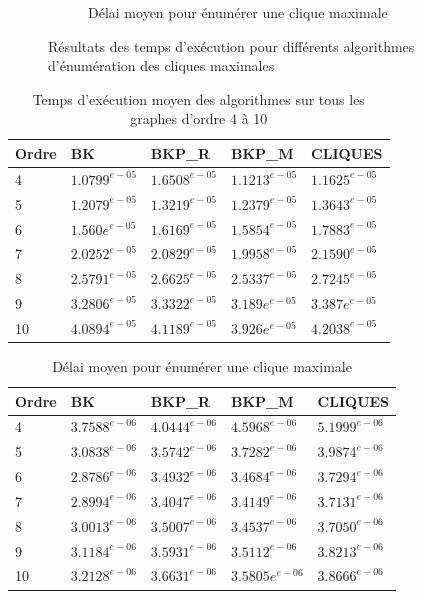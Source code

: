 \documentclass[12pt,a4paper]{article}
\begin{document}
\begin{figure}[h!]
\begin{subfigure}[b]{0.49\textwidth}
        \caption{Délai moyen pour énumérer une clique maximale}
        \label{subfig:delay_plot}
    \end{subfigure}
    \caption{Résultats des temps d'exécution pour différents algorithmes d'énumération des cliques maximales}
    \label{fig:res1}
\end{figure}

\begin{table}[ht]
  \centering
  \begin{tabular}{|l||l|l|l|l|}
    \hline
    Ordre & BK & BKP\_R & BKP\_M & CLIQUES \\
    \hline
    \hline
    4  & $1.0799^{e-05}$ & $1.6508^{e-05}$ & $1.1213^{e-05}$ & $1.1625^{e-05}$ \\
    5  & $1.2079^{e-05}$ & $1.3219^{e-05}$ & $1.2379^{e-05}$ & $1.3643^{e-05}$ \\
    6  & $1.560e^{e-05}$  & $1.6169^{e-05}$ & $1.5854^{e-05}$  & $1.7883^{e-05}$ \\
    7  & $2.0252^{e-05}$ & $2.0829^{e-05}$ & $1.9958^{e-05}$ & $2.1590^{e-05}$   \\
    8  & $2.5791^{e-05}$ & $2.6625^{e-05}$ & $2.5337^{e-05}$   & $2.7245^{e-05}$ \\
    9  & $3.2806^{e-05}$ & $3.3322^{e-05}$  & $3.189e^{e-05}$  & $3.387e^{e-05}$  \\
    10 & $4.0894^{e-05}$ & $4.1189^{e-05}$ & $3.926e^{e-05}$ & $4.2038^{e-05}$  \\
    \hline
  \end{tabular}
  \caption{Temps d'exécution moyen des algorithmes sur tous les graphes d'ordre 4 à 10}
  \label{table:1}
\end{table}
\begin{table}[ht]
  \centering
  \begin{tabular}{|l||l|l|l|l|}
    \hline
    Ordre & BK & BKP\_R & BKP\_M & CLIQUES \\
    \hline
    \hline
    4  & $3.7588^{e-06}$ & $4.0444^{e-06}$ & $4.5968^{e-06}$ & $5.1999^{e-06}$ \\
    5  & $3.0838^{e-06}$ & $3.5742^{e-06}$ & $3.7282^{e-06}$ & $3.9874^{e-06}$ \\
    6  & $2.8786^{e-06}$ & $3.4932^{e-06}$ & $3.4684^{e-06}$ & $3.7294^{e-06}$ \\
    7  & $2.8994^{e-06}$ & $3.4047^{e-06}$ & $3.4149^{e-06}$ & $3.7131^{e-06}$   \\
    8  & $3.0013^{e-06}$ & $3.5007^{e-06}$ & $3.4537^{e-06}$ & $3.7050^{e-06}$ \\
    9  & $3.1184^{e-06}$ & $3.5931^{e-06}$ & $3.5112^{e-06}$ & $3.8213^{e-06}$  \\
    10 & $3.2128^{e-06}$ & $3.6631^{e-06}$ & $3.5805e^{e-06}$ & $3.8666^{e-06}$  \\
    \hline
    \end{tabular}
    \caption{Délai moyen pour énumérer une clique maximale}
    \label{table:2}
\end{table}
\end{document}

